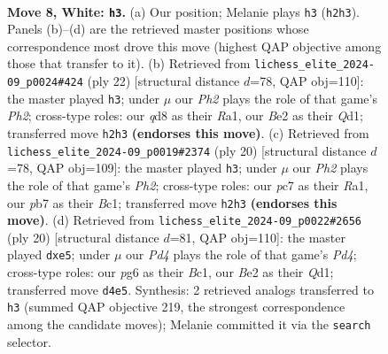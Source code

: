 \documentclass[11pt]{article}
\begin{document}
\begin{figure}[p]\centering
\begin{subfigure}{0.46\textwidth}\centering
\resizebox{\linewidth}{!}{%
\newchessgame
\chessboard[
  setfen={rnbq1rk1/ppp2pbp/3p2p1/4p3/2PPP1n1/2N2N2/PP2BPPP/1RBQK2R w K - 2 8},
  showmover=false,
  pgfstyle=straightmove, color=movearrow, markmove={h2-h3}
]}
\caption{}
\end{subfigure}\hfill
\begin{subfigure}{0.46\textwidth}\centering
\resizebox{\linewidth}{!}{%
\newchessgame
\chessboard[
  setfen={r1b2rk1/ppp2qbp/n2p1pp1/4p3/2PPP1nB/2N2N2/PP2BPPP/R2QR1K1 w - - 4 12},
  showmover=false,
  pgfstyle=straightmove, color=movearrow, markmove={h2-h3}
]}
\caption{}
\end{subfigure}
\\[4pt]
\begin{subfigure}{0.46\textwidth}\centering
\resizebox{\linewidth}{!}{%
\newchessgame
\chessboard[
  setfen={r1bq1rk1/pp4bp/n1pp1pp1/4p3/2PPP1n1/2N2N2/PP2BPPP/R1BQ1RK1 w - - 0 11},
  showmover=false,
  pgfstyle=straightmove, color=movearrow, markmove={h2-h3}
]}
\caption{}
\end{subfigure}\hfill
\begin{subfigure}{0.46\textwidth}\centering
\resizebox{\linewidth}{!}{%
\newchessgame
\chessboard[
  setfen={r1bqk2r/1p3pb1/n1pp2pp/p3p3/2PPP1n1/2N2N2/PP2BPPP/R1BQ1RK1 w kq - 0 11},
  showmover=false,
  pgfstyle=straightmove, color=movearrow, markmove={d4-e5}
]}
\caption{}
\end{subfigure}
\caption{\textbf{Move 8, White: \texttt{h3}.} (a) Our position; Melanie plays \texttt{h3} (\texttt{h2h3}). Panels (b)--(d) are the retrieved master positions whose correspondence most drove this move (highest QAP objective among those that transfer to it). (b) Retrieved from \texttt{lichess\_elite\_2024-09\_p0024\#424} (ply 22) [structural distance $d$=78, QAP obj=110]: the master played \texttt{h3}; under $\mu$ our \emph{Ph2} plays the role of that game's \emph{Ph2}; cross-type roles: our \emph{q}d8 as their \emph{R}a1, our \emph{B}e2 as their \emph{Q}d1; transferred move \texttt{h2h3} \textbf{(endorses this move)}. (c) Retrieved from \texttt{lichess\_elite\_2024-09\_p0019\#2374} (ply 20) [structural distance $d$=78, QAP obj=109]: the master played \texttt{h3}; under $\mu$ our \emph{Ph2} plays the role of that game's \emph{Ph2}; cross-type roles: our \emph{p}c7 as their \emph{R}a1, our \emph{p}b7 as their \emph{B}c1; transferred move \texttt{h2h3} \textbf{(endorses this move)}. (d) Retrieved from \texttt{lichess\_elite\_2024-09\_p0022\#2656} (ply 20) [structural distance $d$=81, QAP obj=110]: the master played \texttt{dxe5}; under $\mu$ our \emph{Pd4} plays the role of that game's \emph{Pd4}; cross-type roles: our \emph{p}g6 as their \emph{B}c1, our \emph{B}e2 as their \emph{Q}d1; transferred move \texttt{d4e5}. Synthesis: 2 retrieved analogs transferred to \texttt{h3} (summed QAP objective 219, the strongest correspondence among the candidate moves); Melanie committed it via the \texttt{search} selector.}
\label{fig:thought-m14}
\end{figure}
\end{document}
